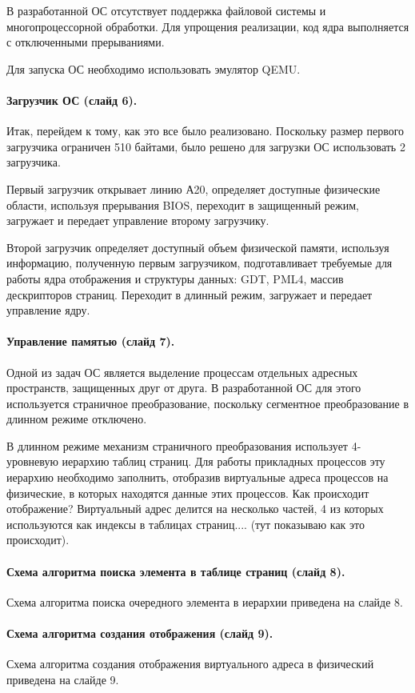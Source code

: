 \documentclass[12pt]{article}
\begin{document}
В разработанной ОС отсутствует поддержка файловой системы и многопроцессорной обработки.
Для упрощения реализации, код ядра выполняется с отключенными прерываниями.

Для запуска ОС необходимо использовать эмулятор QEMU.


\paragraph{Загрузчик ОС (слайд 6).}
Итак, перейдем к тому, как это все было реализовано. Поскольку размер первого загрузчика
ограничен 510 байтами, было решено для загрузки ОС использовать 2 загрузчика.

Первый загрузчик открывает линию А20, определяет доступные физические области, используя
прерывания BIOS, переходит в защищенный режим, загружает и передает управление второму
загрузчику.

Второй загрузчик определяет доступный объем физической памяти, используя информацию, полученную
первым загрузчиком, подготавливает требуемые для работы ядра отображения и структуры данных:
GDT, PML4, массив дескрипторов страниц. Переходит в длинный режим, загружает и передает
управление ядру.


\paragraph{Управление памятью (слайд 7).}
Одной из задач ОС является выделение процессам отдельных адресных пространств, защищенных
друг от друга. В разработанной ОС для этого используется страничное преобразование,
поскольку сегментное преобразование в длинном режиме отключено.

В длинном режиме механизм страничного преобразования использует 4-уровневую иерархию
таблиц страниц. Для работы прикладных процессов эту иерархию необходимо заполнить,
отобразив виртуальные адреса процессов на физические, в которых находятся данные этих
процессов. Как происходит отображение? Виртуальный адрес делится на несколько частей,
4 из которых используются как индексы в таблицах страниц.... (тут показываю как это происходит).

\paragraph{Схема алгоритма поиска элемента в таблице страниц (слайд 8).}
Схема алгоритма поиска очередного элемента в иерархии приведена на слайде 8.

\paragraph{Схема алгоритма создания отображения (слайд 9).}
Схема алгоритма создания отображения виртуального адреса в физический приведена
на слайде 9.
\end{document}

